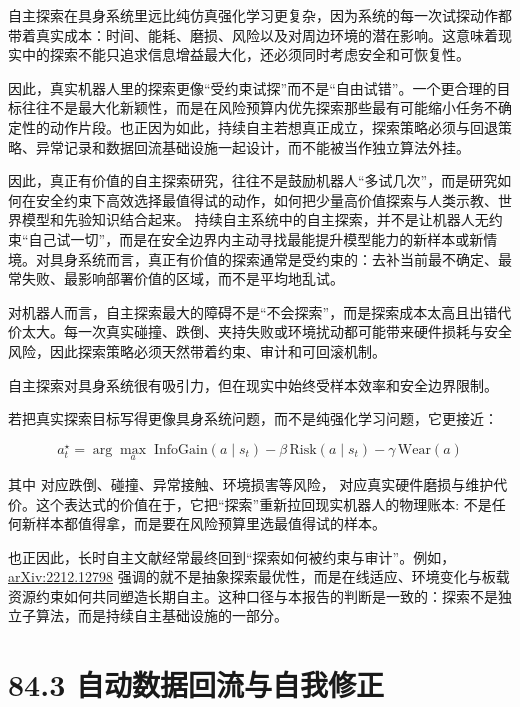 自主探索在具身系统里远比纯仿真强化学习更复杂，因为系统的每一次试探动作都带着真实成本：时间、能耗、磨损、风险以及对周边环境的潜在影响。这意味着现实中的探索不能只追求信息增益最大化，还必须同时考虑安全和可恢复性。

因此，真实机器人里的探索更像“受约束试探”而不是“自由试错”。一个更合理的目标往往不是最大化新颖性，而是在风险预算内优先探索那些最有可能缩小任务不确定性的动作片段。也正因为如此，持续自主若想真正成立，探索策略必须与回退策略、异常记录和数据回流基础设施一起设计，而不能被当作独立算法外挂。

因此，真正有价值的自主探索研究，往往不是鼓励机器人“多试几次”，而是研究如何在安全约束下高效选择最值得试的动作，如何把少量高价值探索与人类示教、世界模型和先验知识结合起来。 持续自主系统中的自主探索，并不是让机器人无约束“自己试一切”，而是在安全边界内主动寻找最能提升模型能力的新样本或新情境。对具身系统而言，真正有价值的探索通常是受约束的：去补当前最不确定、最常失败、最影响部署价值的区域，而不是平均地乱试。

对机器人而言，自主探索最大的障碍不是“不会探索”，而是探索成本太高且出错代价太大。每一次真实碰撞、跌倒、夹持失败或环境扰动都可能带来硬件损耗与安全风险，因此探索策略必须天然带着约束、审计和可回滚机制。

自主探索对具身系统很有吸引力，但在现实中始终受样本效率和安全边界限制。

若把真实探索目标写得更像具身系统问题，而不是纯强化学习问题，它更接近：

\begingroup
\scriptsize
\begin{equation*}
a_t^\star = \arg\max_a \; \text{InfoGain}(a \mid s_t)
- \beta \, \text{Risk}(a \mid s_t)
- \gamma \, \text{Wear}(a)
\end{equation*}
\endgroup

其中 \texttt{} 对应跌倒、碰撞、异常接触、环境损害等风险，\texttt{} 对应真实硬件磨损与维护代价。这个表达式的价值在于，它把“探索”重新拉回现实机器人的物理账本: 不是任何新样本都值得拿，而是要在风险预算里选最值得试的样本。

也正因此，长时自主文献经常最终回到“探索如何被约束与审计”。例如，\href{https://arxiv.org/abs/2212.12798}{arXiv:2212.12798} 强调的就不是抽象探索最优性，而是在线适应、环境变化与板载资源约束如何共同塑造长期自主。这种口径与本报告的判断是一致的：探索不是独立子算法，而是持续自主基础设施的一部分。

\section*{84.3 自动数据回流与自我修正}


